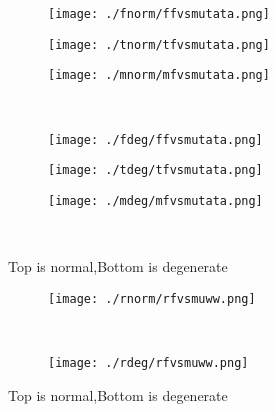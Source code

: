 \documentclass[aps,floats,floatfix,nofootinbib]{revtex4-1}
\begin{document}
\begin{center}
\begin{figure}
\begin{subfigure}{0.3\textwidth}
\texttt{[image: ./fnorm/ffvsmutata.png]}
\label{}
\end{subfigure}
\begin{subfigure}{0.3\textwidth}
\texttt{[image: ./tnorm/tfvsmutata.png]}
\label{}
\end{subfigure}
\begin{subfigure}{0.3\textwidth}
\texttt{[image: ./mnorm/mfvsmutata.png]}
\label{}
\end{subfigure}\\
\begin{subfigure}{0.3\textwidth}
\texttt{[image: ./fdeg/ffvsmutata.png]}
\label{}
\end{subfigure}
\begin{subfigure}{0.3\textwidth}
\texttt{[image: ./tdeg/tfvsmutata.png]}
\label{}
\end{subfigure}
\begin{subfigure}{0.3\textwidth}
\texttt{[image: ./mdeg/mfvsmutata.png]}
\label{}
\end{subfigure}\\
\caption{Top is normal,Bottom is degenerate}
\end{figure}
\end{center}

\begin{center}
\begin{figure}
\begin{subfigure}{1.0\textwidth}
\texttt{[image: ./rnorm/rfvsmuww.png]}
\label{}
\end{subfigure}\\
\begin{subfigure}{1.0\textwidth}
\texttt{[image: ./rdeg/rfvsmuww.png]}
\label{}
\end{subfigure}
\caption{Top is normal,Bottom is degenerate}
\end{figure}
\end{center}
\end{document}
